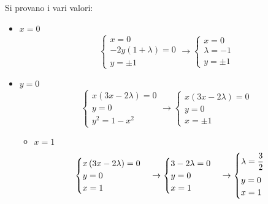 \documentclass[a4paper]{article}
\begin{document}
	Si provano i vari valori:
	\begin{itemize}
		\item $x = 0$
		\begin{equation*}
			\begin{cases}
				x = 0 \\
				-2y\left(1+\lambda\right) = 0 \\
				y = \pm 1
			\end{cases}
			\rightarrow
			\begin{cases}
				x = 0 \\
				\lambda = -1 \\
				y = \pm 1
			\end{cases}
		\end{equation*}

		\item $y = 0$
		\begin{equation*}
			\begin{cases}
				x\left(3x - 2\lambda\right) = 0 \\
				y = 0 \\
				y^{2} = 1-x^{2}
			\end{cases}
			\rightarrow
			\begin{cases}
				x\left(3x - 2\lambda\right) = 0 \\
				y = 0 \\
				x = \pm 1
			\end{cases}
		\end{equation*}
		\begin{itemize}
			\item $x = 1$
			\begin{equation*}
				\begin{cases}
					x\left(3x - 2\lambda\right) = 0 \\
					y = 0 \\
					x = 1
				\end{cases}
				\rightarrow
				\begin{cases}
					3 - 2\lambda = 0 \\
					y = 0 \\
					x = 1
				\end{cases}
				\rightarrow
				\begin{cases}
					\lambda = \dfrac{3}{2} \vspace{.5em}\\
					y = 0 \\
					x = 1
				\end{cases}
			\end{equation*}


\end{itemize}
\end{itemize}
\end{document}
